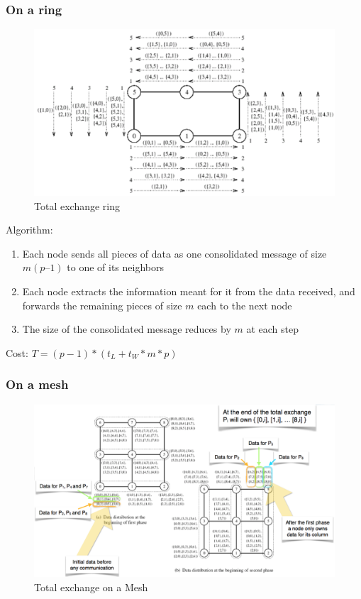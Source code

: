 \documentclass[11pt,a4paper]{report}
\begin{document}
\subsubsection{On a ring}

\begin{figure}[H]
    \centering
    \includegraphics[width=0.7\linewidth]{img/comm_ring_totalexchange}
    \caption{Total exchange ring}
    \label{fig:commringtotalexchange}
\end{figure}

Algorithm:

\begin{enumerate}
    \item Each node sends all pieces of data as one consolidated message of 
    size $m(p – 1)$ to one of its neighbors
    
    \item Each node extracts the information meant for it from the data 
    received, and forwards the remaining pieces of size $m$ each to the next 
    node
    
    \item The size of the consolidated message reduces by $m$ at each step
\end{enumerate}

Cost: $ T = (p-1) * (t_{L} + t_{W} * m * p) $

\subsubsection{On a mesh}

\begin{figure}[H]
    \centering
    \includegraphics[width=0.7\linewidth]{img/comm_mesh_totalexchange}
    \caption{Total exchange on a Mesh}
    \label{fig:commmeshtotalexchange}
\end{figure}
\end{document}
